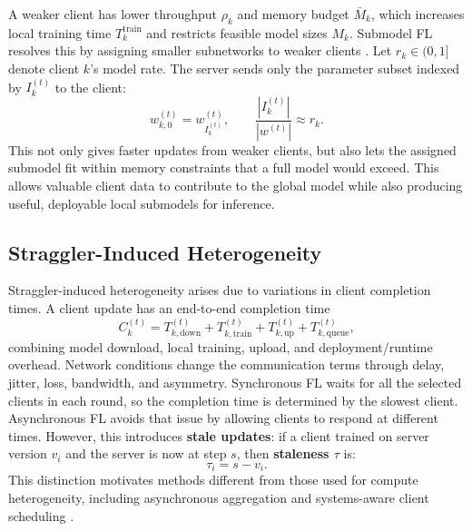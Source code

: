 A weaker client has lower throughput \(\rho_k\) and memory budget \(\bar{M}_k\), which increases local training time \(T_k^{\mathrm{train}}\) and restricts feasible model sizes \(M_k\). Submodel FL resolves this by assigning smaller subnetworks to weaker clients \parencite{diao2021heterofl,horvath2021fjord,alam2022fedrolex,wu2024fiarse}. Let \(r_k\in(0,1]\) denote client \(k\)'s model rate. The server sends only the parameter subset indexed by \(I_k^{(t)}\) to the client:
\[
    w_{k,0}^{(t)} = w^{(t)}_{I_k^{(t)}},
    \qquad
    \frac{|I_k^{(t)}|}{|w^{(t)}|} \approx r_k.
\]
This not only gives faster updates from weaker clients, but also lets the assigned submodel fit within memory constraints that a full model would exceed. This allows valuable client data to contribute to the global model while also producing useful, deployable local submodels for inference.

\subsection{Straggler-Induced Heterogeneity}
\label{sec:background_straggler_heterogeneity}

Straggler-induced heterogeneity arises due to variations in client completion times. A client update has an end-to-end completion time
\[
    C_k^{(t)}
    =
    T_{k,\mathrm{down}}^{(t)}
    +
    T_{k,\mathrm{train}}^{(t)}
    +
    T_{k,\mathrm{up}}^{(t)}
    +
    T_{k,\mathrm{queue}}^{(t)},
\]
combining model download, local training, upload, and deployment/runtime overhead. Network conditions change the communication terms through delay, jitter, loss, bandwidth, and asymmetry. Synchronous FL waits for all the selected clients in each round, so the completion time is determined by the slowest client. Asynchronous FL avoids that issue by allowing clients to respond at different times. However, this introduces \textbf{stale updates}: if a client trained on server version \(v_i\) and the server is now at step \(s\), then \textbf{staleness \(\tau\)} is:
\[
    \tau_i = s - v_i.
\]
This distinction motivates methods different from those used for compute heterogeneity, including asynchronous aggregation and systems-aware client scheduling \parencite{xie2019asynchronous,nguyen2022fedbuff,ma2024fedstaleweight,lai2021oort}.


